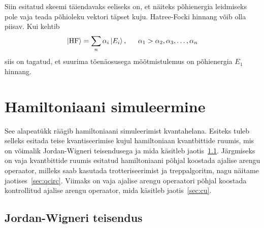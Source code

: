 \documentclass[12pt]{report}
\def\ket#1{\left|#1\right>}
\begin{document}
Siin esitatud skeemi täiendavaks eeliseks on, et näiteks põhienergia leidmiseks pole vaja teada põhioleku vektori täpset kuju.
Hatree-Focki hinnang võib olla piisav.
Kui kehtib
\begin{align}
    \ket{\text{HF}} = \sum_n \alpha_i \ket{E_i} \rlap{,}
    \qquad \alpha_1 > \alpha_2, \alpha_3, \ldots, \alpha_n
\end{align}
siis on tagatud, et suurima tõenäosusega mõõtmistulemus on põhienergia \(E_1\) hinnang.

\section{Hamiltoniaani simuleermine}

See alapeatükk räägib hamiltoniaani simuleerimist kvantahelana.
Esiteks tuleb selleks esitada teise kvantiseerimise kujul hamiltoniaan kvantbittide ruumis, mis on võimalik Jordan-Wigneri teisendusega ja mida käsitleb jaotis~\ref{sec:jw}.
Järgmiseks on vaja kvantbittide ruumis esitatud hamiltoniaani põhjal koostada ajalise arengu operaator, milleks saab kasutada trotteriseerimist ja treppalgoritm, nagu näitame jaotises~\ref{sec:qcirc}.
Viimaks on vaja ajalise arengu operaatori põhjal koostada kontrollitud ajalise arengu operaator, mida käsitleb jaotis~\ref{sec:cu}.

\subsection{Jordan-Wigneri teisendus}\label{sec:jw}
\end{document}
